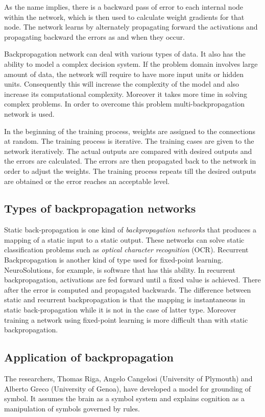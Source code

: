 \documentclass[a4paper]{article}
\begin{document}
As the name implies, there is a backward pass of error to each internal node within the network, which is then used to calculate weight gradients for that node. The network learns by alternately propagating forward the activations and propagating backward the errors as and when they occur.

Backpropagation network can deal with various types of data. It also has the ability to model a complex decision system. If the problem domain involves large amount of data, the network will require to have more input units or hidden units. Consequently this will increase the complexity of the model and also increase its computational complexity. Moreover it takes more time in solving complex problems. In order to overcome this problem multi-backpropagation network is used.

In the beginning of the training process, weights are assigned to the connections at random. The training process is iterative. The training cases are given to the network iteratively. The actual outputs are compared with desired outputs and the errors are calculated. The errors are then propagated back to the network in order to adjust the weights. The training process repeats till the desired outputs are obtained or the error reaches an acceptable level.
\subsection{Types of backpropagation networks}
Static back-propagation is one kind of \textit{backpropagation networks} that produces a mapping of a static input to a static output. These networks can solve static classification problems such as \textit{optical character recognition} (OCR). Recurrent Backpropagation is another kind of type used for fixed-point learning. NeuroSolutions, for example, is software that has this ability. In recurrent backpropagation, activations are fed forward until a fixed value is achieved. There after the error is computed and propagated backwards. The difference between static and recurrent backpropagation is that the mapping is instantaneous in static back-propagation while it is not in the case of latter type. Moreover training a network using fixed-point learning is more difficult than with static backpropagation.
\subsection{Application of backpropagation}
The researchers, Thomas Riga, Angelo Cangelosi (University of Plymouth) and Alberto Greco (University of Genoa), have developed a model for grounding of symbol. It assumes the brain as a symbol system and explains cognition as a manipulation of symbols governed by rules.
\end{document}
